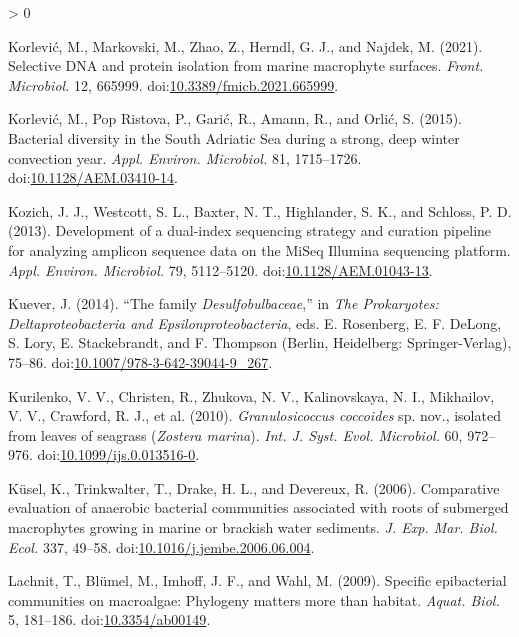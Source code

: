 \documentclass[
  12pt,
]{article}
\newlength{\cslhangindent}
\newenvironment{CSLReferences}[2] %
 {%
  \setlength{\parindent}{0pt}
  \ifodd #1 \everypar{\setlength{\hangindent}{\cslhangindent}}\ignorespaces\fi
  \ifnum #2 > 0
  \setlength{\parskip}{#2\baselineskip}
  \fi
 }%
 {}
\begin{document}
\begin{CSLReferences}{1}{0}
\leavevmode\hypertarget{ref-Korlevic2021}{}%
Korlević, M., Markovski, M., Zhao, Z., Herndl, G. J., and Najdek, M.
(2021). Selective {DNA} and protein isolation from marine macrophyte
surfaces. \emph{Front. Microbiol.} 12, 665999.
doi:\href{https://doi.org/10.3389/fmicb.2021.665999}{10.3389/fmicb.2021.665999}.

\leavevmode\hypertarget{ref-Korlevic2015}{}%
Korlević, M., Pop Ristova, P., Garić, R., Amann, R., and Orlić, S.
(2015). Bacterial diversity in the {South Adriatic Sea} during a strong,
deep winter convection year. \emph{Appl. Environ. Microbiol.} 81,
1715--1726.
doi:\href{https://doi.org/10.1128/AEM.03410-14}{10.1128/AEM.03410-14}.

\leavevmode\hypertarget{ref-Kozich2013}{}%
Kozich, J. J., Westcott, S. L., Baxter, N. T., Highlander, S. K., and
Schloss, P. D. (2013). Development of a dual-index sequencing strategy
and curation pipeline for analyzing amplicon sequence data on the {MiSeq
Illumina} sequencing platform. \emph{Appl. Environ. Microbiol.} 79,
5112--5120.
doi:\href{https://doi.org/10.1128/AEM.01043-13}{10.1128/AEM.01043-13}.

\leavevmode\hypertarget{ref-Kuever2014}{}%
Kuever, J. (2014). {``The family {\emph{Desulfobulbaceae}},''} in
\emph{The {Prokaryotes}: {Deltaproteobacteria} and
{Epsilonproteobacteria}}, eds. E. Rosenberg, E. F. DeLong, S. Lory, E.
Stackebrandt, and F. Thompson ({Berlin, Heidelberg}: {Springer-Verlag}),
75--86.
doi:\href{https://doi.org/10.1007/978-3-642-39044-9_267}{10.1007/978-3-642-39044-9\_267}.

\leavevmode\hypertarget{ref-Kurilenko2010}{}%
Kurilenko, V. V., Christen, R., Zhukova, N. V., Kalinovskaya, N. I.,
Mikhailov, V. V., Crawford, R. J., et al. (2010).
{{\emph{Granulosicoccus coccoides}} sp. nov., isolated from leaves of
seagrass ({\emph{Zostera marina}})}. \emph{Int. J. Syst. Evol.
Microbiol.} 60, 972--976.
doi:\href{https://doi.org/10.1099/ijs.0.013516-0}{10.1099/ijs.0.013516-0}.

\leavevmode\hypertarget{ref-Kusel2006}{}%
Küsel, K., Trinkwalter, T., Drake, H. L., and Devereux, R. (2006).
Comparative evaluation of anaerobic bacterial communities associated
with roots of submerged macrophytes growing in marine or brackish water
sediments. \emph{J. Exp. Mar. Biol. Ecol.} 337, 49--58.
doi:\href{https://doi.org/10.1016/j.jembe.2006.06.004}{10.1016/j.jembe.2006.06.004}.

\leavevmode\hypertarget{ref-Lachnit2009}{}%
Lachnit, T., Blümel, M., Imhoff, J. F., and Wahl, M. (2009). Specific
epibacterial communities on macroalgae: Phylogeny matters more than
habitat. \emph{Aquat. Biol.} 5, 181--186.
doi:\href{https://doi.org/10.3354/ab00149}{10.3354/ab00149}.


\end{CSLReferences}
\end{document}
